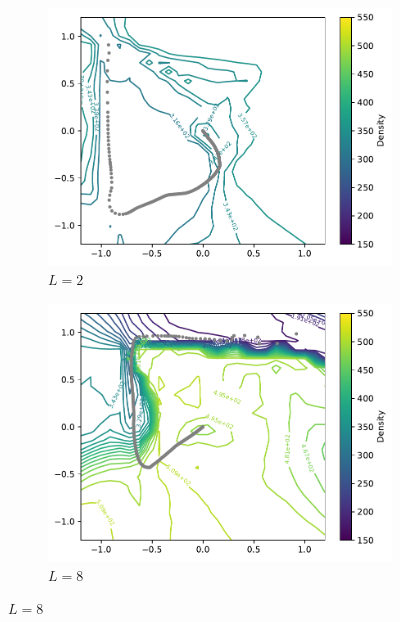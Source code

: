 \documentclass[letterpaper]{article} %
\begin{document}
        \begin{figure}[htb]
          \centering
        \begin{subfigure}[b]{0.23\textwidth}
            \includegraphics[width=\textwidth]{figures/round3/grid2/map_residual_grid_density.pdf}
            \caption{$L=2$}
          \end{subfigure}
          \hfill
          \begin{subfigure}[b]{0.23\textwidth}
            \includegraphics[width=\textwidth]{figures/round3/grid8/map_residual_grid_density.pdf}
            \caption{$L=8$}
          \end{subfigure}


\end{figure}
\end{document}
